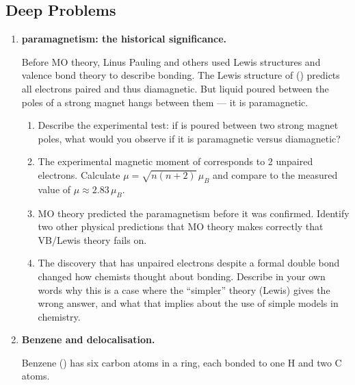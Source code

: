 \documentclass[12pt, a4paper]{book}
\begin{document}
\subsection*{Deep Problems}

\begin{deepbox}
\begin{enumerate}[label=\textbf{D\arabic*.}]

  \item \textbf{ paramagnetism: the historical significance.}

    Before MO theory, Linus Pauling and others used Lewis
    structures and valence bond theory to describe bonding.
    The Lewis structure of  () predicts all
    electrons paired and thus diamagnetic.
    But liquid  poured between the poles of a strong
    magnet hangs between them --- it is paramagnetic.

    \begin{enumerate}[label=(\alph*)]
      \item Describe the experimental test: if  is
            poured between two strong magnet poles,
            what would you observe if it is paramagnetic
            versus diamagnetic?
      \item The experimental magnetic moment of 
            corresponds to 2 unpaired electrons.
            Calculate $\mu = \sqrt{n(n+2)}\,\mu_B$
            and compare to the measured value of
            $\mu \approx 2.83\,\mu_B$.
      \item MO theory predicted the paramagnetism before
            it was confirmed.
            Identify two other physical predictions that
            MO theory makes correctly that VB/Lewis theory
            fails on.
      \item The discovery that  has unpaired electrons
            despite a formal double bond changed how chemists
            thought about bonding.
            Describe in your own words why this is a case
            where the ``simpler'' theory (Lewis) gives the
            wrong answer, and what that implies about
            the use of simple models in chemistry.
    \end{enumerate}

  \item \textbf{Benzene and delocalisation.}

    Benzene () has six carbon atoms in a ring,
    each bonded to one H and two C atoms.


\end{enumerate}
\end{deepbox}
\end{document}
